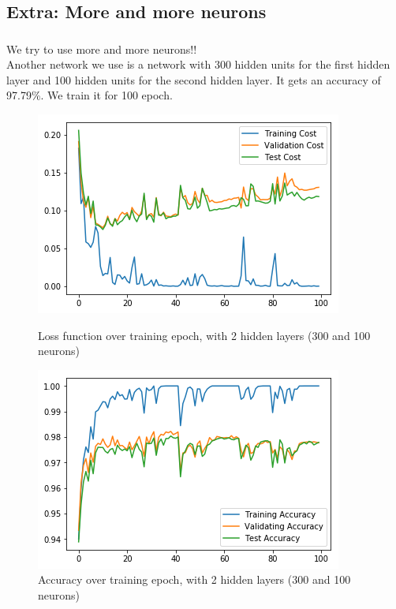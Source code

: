 \documentclass{article}
\begin{document}
\subsection{Extra: More and more neurons}
\subsubsection{}
We try to use more and more neurons!!\\
Another network we use is a network with 300 hidden units for the first hidden layer and 100 hidden units for the second hidden layer. It gets an accuracy of 97.79\%. We train it for 100 epoch.
\begin{figure}[h]
	\begin{minipage}{0.48\textwidth}
	\centering
	\includegraphics[width=\textwidth]{pics/loss_300_100.png}
	\caption{Loss function over training epoch, with 2 hidden layers (300 and 100 neurons)}
	\end{minipage}\hfill
	\begin{minipage}{0.48\textwidth}
	\centering
	\includegraphics[width=\textwidth]{pics/acc_300_100.png}
	\caption{Accuracy over training epoch, with 2 hidden layers (300 and 100 neurons)}
	\end{minipage}
\end{figure}
\end{document}

